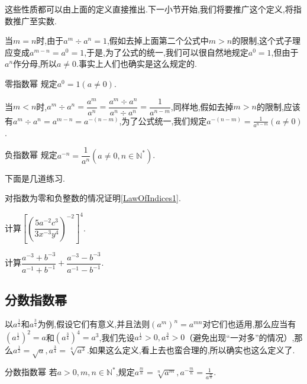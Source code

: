 \documentclass[lang=cn,math=cm,chinesefont=nofont,11pt,scheme=chinese,twocol]{elegantbook}
\begin{document}
这些性质都可以由上面的定义直接推出.下一小节开始,我们将要推广这个定义,将指数推广至实数.

当$m=n$时,由于$a^m\div a^n=1$,假如去掉上面第二个公式中$m>n$的限制,这个式子理应变成$a^{m-n}=a^0=1$,于是,为了公式的统一,我们可以很自然地规定$a^0=1$,但由于$a^n$作分母,所以$a\neq 0$.事实上人们也确实是这么规定的.

\begin{definition}{零指数幂}
  规定$a^0=1(a\neq 0)$.
\end{definition}

当$m<n$时,$a^m\div a^n=\dfrac{a^m}{a^n}=\dfrac{a^m\div a^n}{a^n\div a^n}=\dfrac1{a^{n-m}}$,同样地,假如去掉$m>n$的限制,应该有$a^m\div a^n=a^{m-n}=a^{-(n-m)}$,为了公式统一,我们规定$a^{-(n-m)}=\frac1{a^{n-m}}(a\neq0)$.

\begin{definition}{负指数幂}
  规定$a^{-n}=\dfrac{1}{a^n}(a\neq 0,n\in\mathbb{N}^*)$.
\end{definition}

下面是几道练习.

\begin{exercise}
  对指数为零和负整数的情况证明\ref{LawOfIndices1}.
\end{exercise}

\begin{spacing}{1.8}
  \begin{exercise}\label{ZXSXSYJC_reformatted_3_P9.8b}
  计算$\left[\left(\dfrac{5a^{-2}c^3}{3x^{-3}y^4}\right)^{-2}\right]^4$.
  \end{exercise}

  \begin{exercise}\label{ZXSXSYJC_reformatted_3_P9.9b}
  计算$\dfrac{a^{-3}+b^{-3}}{a^{-1}+b^{-1}}+\dfrac{a^{-3}-b^{-3}}{a^{-1}-b^{-1}}$.
  \end{exercise}
\end{spacing}

\subsection{分数指数幂}

以$a^\frac{1}{2}$和$a^\frac34$为例,假设它们有意义,并且法则$(a^m)^n=a^{mn}$对它们也适用,那么应当有$(a^\frac{1}{2})^2=a$和$(a^\frac34)^4=a^3$,我们先设$a^\frac{1}{2}>0,a^\frac34>0$（避免出现“一对多”的情况）,那么$a^\frac{1}{2}=\sqrt{a},a^\frac34=\sqrt[4]{a^3}$.如果这么定义,看上去也蛮合理的,所以确实也这么定义了.

\begin{definition}{分数指数幂}
  若$a>0,m,n\in\mathbb{N}^*$,规定$a^\frac mn=\sqrt[n]{a^m},a^{-\frac mn}=\frac1{a^\frac mn}$.
\end{definition}
\end{document}
